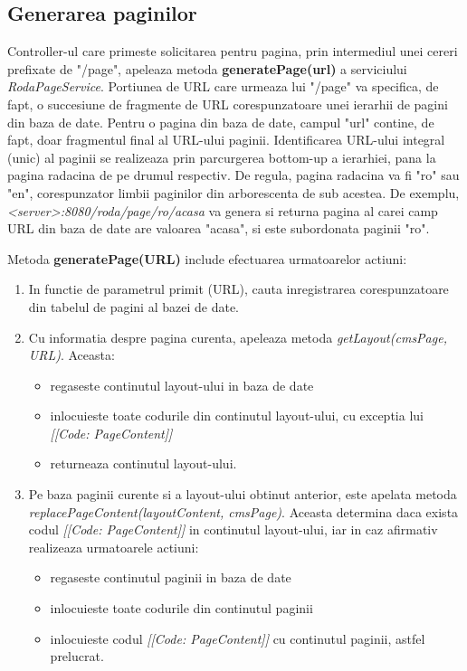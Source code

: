 \subsection{Generarea paginilor}
\label{generarea_paginilor}

Controller-ul care primeste solicitarea pentru pagina, prin intermediul unei cereri prefixate de "/page", 
apeleaza metoda \textbf{generatePage(url)} a serviciului \emph{RodaPageService}. 
Portiunea de URL care urmeaza lui "/page" va specifica, de fapt, o succesiune de fragmente de URL corespunzatoare unei ierarhii de pagini din baza de date. 
Pentru o pagina din baza de date, campul "url" contine, de fapt, doar fragmentul final al URL-ului paginii. 
Identificarea URL-ului integral (unic) al paginii se realizeaza prin parcurgerea bottom-up a ierarhiei, pana la pagina radacina de pe drumul respectiv. 
De regula, pagina radacina va fi "ro" sau "en", corespunzator limbii paginilor din arborescenta de sub acestea. 
De exemplu, \emph{<server>:8080/roda/page/ro/acasa} va genera si returna pagina al carei camp URL din baza de date are valoarea "acasa", si este subordonata paginii "ro". 

Metoda \textbf{generatePage(URL)} include efectuarea urmatoarelor actiuni:

\begin{enumerate}
\item{In functie de parametrul primit (URL), cauta inregistrarea corespunzatoare din tabelul de pagini al bazei de date.}
\item{Cu informatia despre pagina curenta, apeleaza metoda \emph{getLayout(cmsPage, URL)}. Aceasta:}
\begin{itemize}
\item{regaseste continutul layout-ului in baza de date}
\item{inlocuieste toate codurile din continutul layout-ului, cu exceptia lui \emph{[[Code: PageContent]]}}
\item{returneaza continutul layout-ului.}
\end {itemize}
\item{Pe baza paginii curente si a layout-ului obtinut anterior, este apelata metoda \emph{replacePageContent(layoutContent, cmsPage)}. 
Aceasta determina daca exista codul \emph{[[Code: PageContent]]} in continutul layout-ului, iar in caz afirmativ realizeaza urmatoarele actiuni:}
\begin{itemize}
\item {regaseste continutul paginii in baza de date}
\item{inlocuieste toate codurile din continutul paginii}
\item {inlocuieste codul \emph{[[Code: PageContent]]} cu continutul paginii, astfel prelucrat.}
\end{itemize}
\end{enumerate}

